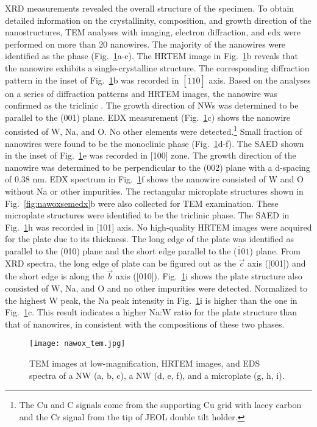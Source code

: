 XRD measurements revealed the overall structure of the specimen. To obtain detailed information on the crystallinity, composition, and growth direction of the nanostructures, TEM analyses with imaging, electron diffraction, and \gls{edx} were performed on more than 20 nanowires. The majority of the nanowires were identified as the  phase (Fig.~\ref{fig:nawoxtem}a-c). The HRTEM image in Fig.~\ref{fig:nawoxtem}b reveals that the nanowire exhibits a single-crystalline structure. The corresponding diffraction pattern in the inset of Fig.~\ref{fig:nawoxtem}b was recorded in $[\bar{1}10]$ axis. Based on the analyses on a series of diffraction patterns and HRTEM images, the nanowire was confirmed as the triclinic . The growth direction of  NWs was determined to be parallel to the (001) plane. EDX measurement (Fig.~\ref{fig:nawoxtem}c) shows the nanowire consisted of W, Na, and O. No other elements were detected.\footnote{The Cu and C signals come from the supporting Cu grid with lacey carbon and the Cr signal from the tip of JEOL double tilt holder.} Small fraction of nanowires were found to be the monoclinic  phase (Fig.~\ref{fig:nawoxtem}d-f). The SAED shown in the inset of Fig.~\ref{fig:nawoxtem}e was recorded in [100] zone. The growth direction of the  nanowire was determined to be perpendicular to the (002) plane with a d-spacing of 0.38 nm. EDX spectrum in Fig.~\ref{fig:nawoxtem}f shows the nanowire consisted of W and O without Na or other impurities. The rectangular microplate structures shown in Fig.~\ref{fig:nawoxsemedx}b were also collected for TEM examination. These microplate structures were identified to be the triclinic  phase. The SAED in Fig.~\ref{fig:nawoxtem}h was recorded in [101] axis. No high-quality HRTEM images were acquired for the  plate due to its thickness. The long edge of the plate was identified as parallel to the (010) plane and the short edge parallel to the ($\bar{1}01$) plane. From XRD spectra, the long edge of  plate can be figured out as the $\vec{c}$ axis ([001]) and the short edge is along the $\vec{b}$ axis ([010]). Fig.~\ref{fig:nawoxtem}i shows the plate structure also consisted of W, Na, and O and no other impurities were detected. Normalized to the highest W peak, the Na peak intensity in Fig.~\ref{fig:nawoxtem}i is higher than the one in Fig.~\ref{fig:nawoxtem}c. This result indicates a higher Na:W ratio for the  plate structure than that of  nanowires, in consistent with the compositions of these two phases.
\begin{figure}[htb]
\centering
\texttt{[image: nawox\_tem.jpg]}
\caption[SEM images of morphology evolution]{TEM images at low-magnification, HRTEM images, and EDS spectra of a  NW (a, b, c), a  NW (d, e, f), and a  microplate (g, h, i). }
\label{fig:nawoxtem}
\end{figure}


